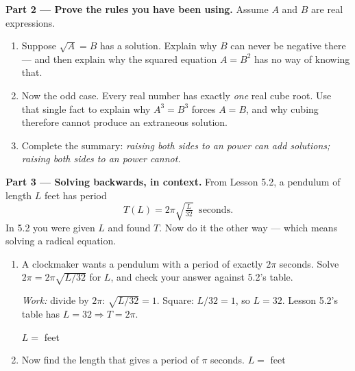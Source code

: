 \documentclass[10pt]{article}
\begin{document}
\begin{tcolorbox}[colback=white, colframe=black!40, title=\textbf{Tier E --- Extension},
    fonttitle=\bfseries, arc=1.5mm, left=3mm, right=3mm, top=2mm, bottom=2mm, breakable]
\vspace{4pt}
\textbf{Part 2 --- Prove the rules you have been using.} Assume $A$ and $B$ are real expressions.
\begin{enumerate}[label=(\alph*), leftmargin=1.9em, itemsep=6pt, start=4]
  \item Suppose $\sqrt{A}=B$ has a solution. Explain why $B$ can never be negative there --- and
        then explain why the squared equation $A=B^{2}$ has no way of knowing that. 
  \item Now the odd case. Every real number has exactly \emph{one} real cube root. Use that single
        fact to explain why $A^{3}=B^{3}$ forces $A=B$, and why cubing therefore cannot produce an
        extraneous solution. 
  \item Complete the summary: \emph{raising both sides to an  power can
        add solutions; raising both sides to an  power cannot.}
\end{enumerate}

\vspace{4pt}
\textbf{Part 3 --- Solving backwards, in context.} From Lesson 5.2, a pendulum of length $L$ feet
has period
\[ T(L)=2\pi\sqrt{\tfrac{L}{32}} \ \text{ seconds.} \]
In 5.2 you were given $L$ and found $T$. Now do it the other way --- which means solving a radical
equation.
\begin{enumerate}[label=(\alph*), leftmargin=1.9em, itemsep=6pt, start=7]
  \item A clockmaker wants a pendulum with a period of exactly $2\pi$ seconds. Solve
        $2\pi=2\pi\sqrt{L/32}$ for $L$, and check your answer against 5.2's table.

        {\small \emph{Work:} divide by $2\pi$: $\sqrt{L/32}=1$. Square: $L/32=1$, so $L=32$.
        Lesson 5.2's table has $L=32 \Rightarrow T=2\pi$. \checkmark}

        $L=$  feet
  \item Now find the length that gives a period of $\pi$ seconds. \; $L=$  feet


\end{enumerate}
\end{tcolorbox}
\end{document}
